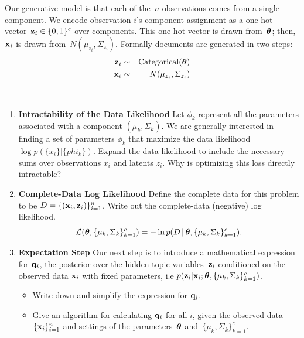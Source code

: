 \documentclass[submit]{harvardml}
\begin{document}
Our generative model is that each of the~$n$ observations comes from a
single component.  We encode observation $i$'s component-assignment as
a one-hot vector~${\mathbf{z}_i \in \{0,1\}^c}$ over components. This
one-hot vector is drawn from~$\boldsymbol{\theta}$; then, $\mathbf{x}_i$ is drawn
from~$N(\mu_{z_i}, \Sigma_{z_i})$. Formally documents are generated in two steps:
\begin{eqnarray*}
 \mathbf{z}_i &\sim& \text{Categorical}(\boldsymbol{\theta}) \\
 \mathbf{x}_i &\sim& N(\mu_{z_i}, \Sigma_{z_i})
\end{eqnarray*}


\begin{problem}
  ~

  \begin{enumerate}

  \item \textbf{Intractability of the Data Likelihood} Let $\phi_k$
    represent all the parameters associated with a component
    $(\mu_k,\Sigma_k)$.  We are generally interested in finding a set
    of parameters $\phi_k$ that maximize the data likelihood $\log
    p(\{x_i\}|\{phi_k\})$.  Expand the data likelihood to include the
    necessary sums over observations $x_i$ and latents $z_i$.  Why is
    optimizing this loss directly intractable?

\item \textbf{Complete-Data Log Likelihood} Define the complete data for this
    problem to be $D = \{(\mathbf{x}_i, \mathbf{z}_i)\}_{i=1}^n$. Write out the
    complete-data (negative) log likelihood. \[\mathcal{L}(\boldsymbol{\theta},
        \{\mu_k,\Sigma_k\}^c_{k=1}) =  -\ln p(D \,|\,\boldsymbol{\theta},
    \{\mu_k,\Sigma_k\}^c_{k=1}).\]


\item \textbf{Expectation Step} Our next step is to introduce a mathematical
    expression for $\mathbf{q}_i$, the posterior over the hidden topic
    variables~$\mathbf{z}_i$ conditioned on the observed data $\mathbf{x}_i$ with fixed
    parameters, i.e $p(\mathbf{z}_i | \mathbf{x}_i; \boldsymbol{\theta}, \{ \mu_k,\Sigma_k
    \}^c_{k=1})$.

\begin{itemize}
    \item  Write down and simplify the expression for $\mathbf{q}_i$.
    \item  Give an algorithm for calculating $\mathbf{q}_i$ for all $i$, given the
        observed data~$\{\mathbf{x}_i\}^n_{i=1}$ and settings of the
        parameters~$\boldsymbol{\theta}$ and~$\{ \mu_k,\Sigma_k  \}^c_{k=1}$.


\end{itemize}
\end{enumerate}
\end{problem}
\end{document}
